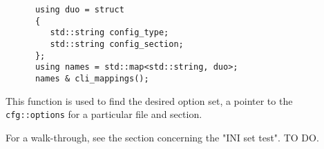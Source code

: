    \begin{verbatim}
      using duo = struct
      {
         std::string config_type;
         std::string config_section;
      };
      using names = std::map<std::string, duo>;
      names & cli_mappings();
   \end{verbatim}

   This function is used to find the desired option set, a pointer to
   the \texttt{cfg::options} for a particular file and section.

   For a walk-through, see the section concerning the "INI set test".
   TO DO.


